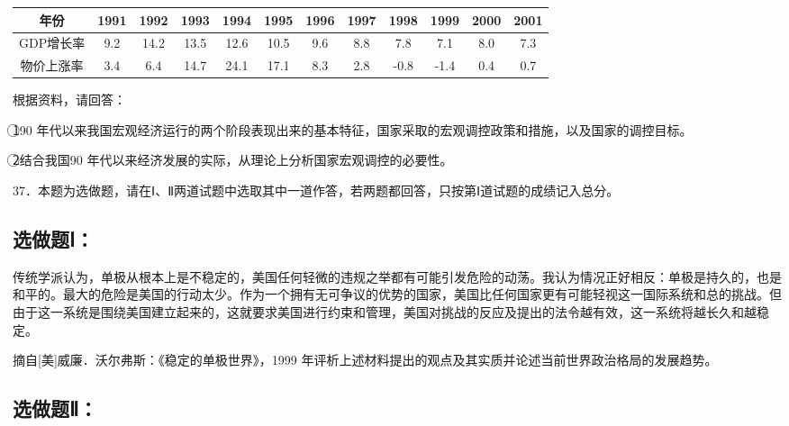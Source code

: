 \documentclass[UTF8,11pt]{ctexart}
\begin{document}
\begin{center}\begin{adjustbox}{max width=\linewidth}\begin{tabular}{|c|c|c|c|c|c|c|c|c|c|c|c|}\hline
年份 & 1991 & 1992 & 1993 & 1994 & 1995 & 1996 & 1997 & 1998 & 1999 & 2000 & 2001\\\hline
GDP增长率 & 9.\allowbreak{}2 & 14.\allowbreak{}2 & 13.\allowbreak{}5 & 12.\allowbreak{}6 & 10.\allowbreak{}5 & 9.\allowbreak{}6 & 8.\allowbreak{}8 & 7.\allowbreak{}8 & 7.\allowbreak{}1 & 8.\allowbreak{}0 & 7.\allowbreak{}3\\\hline
物价上涨率 & 3.\allowbreak{}4 & 6.\allowbreak{}4 & 14.\allowbreak{}7 & 24.\allowbreak{}1 & 17.\allowbreak{}1 & 8.\allowbreak{}3 & 2.\allowbreak{}8 & -0.\allowbreak{}8 & -1.\allowbreak{}4 & 0.\allowbreak{}4 & 0.\allowbreak{}7\\\hline\end{tabular}\end{adjustbox}\end{center}

根据资料，请回答：


\textcircled{1}90 年代以来我国宏观经济运行的两个阶段表现出来的基本特征，国家采取的宏观调控政策和措施，以及国家的调控目标。


\textcircled{2}结合我国90 年代以来经济发展的实际，从理论上分析国家宏观调控的必要性。


37．本题为选做题，请在Ⅰ、Ⅱ两道试题中选取其中一道作答，若两题都回答，只按第Ⅰ道试题的成绩记入总分。


\subsection*{选做题Ⅰ：}

传统学派认为，单极从根本上是不稳定的，美国任何轻微的违规之举都有可能引发危险的动荡。我认为情况正好相反：单极是持久的，也是和平的。最大的危险是美国的行动太少。作为一个拥有无可争议的优势的国家，美国比任何国家更有可能轻视这一国际系统和总的挑战。但由于这一系统是围绕美国建立起来的，这就要求美国进行约束和管理，美国对挑战的反应及提出的法令越有效，这一系统将越长久和越稳定。

摘自[美]威廉．沃尔弗斯：《稳定的单极世界》，1999 年评析上述材料提出的观点及其实质并论述当前世界政治格局的发展趋势。

\subsection*{选做题Ⅱ：}
\end{document}

